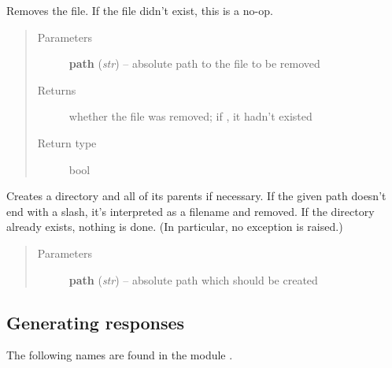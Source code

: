 \documentclass[a4paper,11pt,english]{sphinxmanual}
\begin{document}

\begin{fulllineitems}
\label{programming/utilities:jb_common.utils.base.remove_file}
Removes the file.  If the file didn't exist, this is a no-op.
\begin{quote}\begin{description}
\item[{Parameters}] \leavevmode
\textbf{path} (\emph{str}) -- absolute path to the file to be removed

\item[{Returns}] \leavevmode
whether the file was removed; if , it hadn't existed

\item[{Return type}] \leavevmode
bool

\end{description}\end{quote}

\end{fulllineitems}


\begin{fulllineitems}
\label{programming/utilities:jb_common.utils.base.mkdirs}
Creates a directory and all of its parents if necessary.  If the given
path doesn't end with a slash, it's interpreted as a filename and removed.
If the directory already exists, nothing is done.  (In particular, no
exception is raised.)
\begin{quote}\begin{description}
\item[{Parameters}] \leavevmode
\textbf{path} (\emph{str}) -- absolute path which should be created

\end{description}\end{quote}

\end{fulllineitems}



\subsection{Generating responses}
\label{programming/utilities:generating-responses}
The following names are found in the module .
\end{document}
